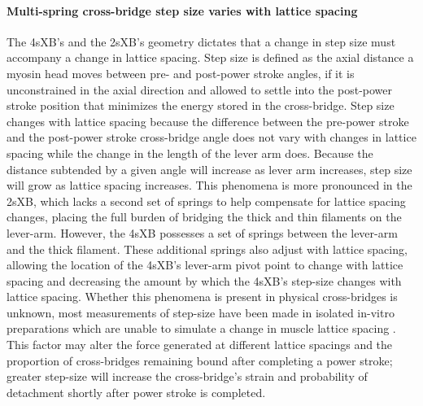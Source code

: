 \documentclass[]{article}
\begin{document}
\paragraph{Multi-spring cross-bridge step size varies with lattice spacing} %
The 4sXB's and the 2sXB's geometry dictates that a change in step size must accompany a change in lattice spacing. 
Step size is defined as the axial distance a myosin head moves between pre- and post-power stroke angles, if it is unconstrained in the axial direction and allowed to settle into the post-power stroke position that minimizes the energy stored in the cross-bridge.
Step size changes with lattice spacing because the difference between the pre-power stroke and the post-power stroke cross-bridge angle does not vary with changes in lattice spacing while the change in the length of the lever arm does. 
Because the distance subtended by a given angle will increase as lever arm increases, step size will grow as lattice spacing increases. 
This phenomena is more pronounced in the 2sXB, which lacks a second set of springs to help compensate for lattice spacing changes, placing the full burden of bridging the thick and thin filaments on the lever-arm. 
However, the 4sXB possesses a set of springs between the lever-arm and the thick filament.
These additional springs also adjust with lattice spacing, allowing the location of the 4sXB's lever-arm pivot point to change with lattice spacing and decreasing the amount by which the 4sXB's step-size changes with lattice spacing.  
Whether this phenomena is present in physical cross-bridges is unknown, most measurements of step-size have been made in isolated in-vitro preparations which are unable to simulate a change in muscle lattice spacing \citep{HowardBook, Peterman2004}.  
This factor may alter the force generated at different lattice spacings and the proportion of cross-bridges remaining bound after completing a power stroke; greater step-size will increase the cross-bridge's strain and probability of detachment shortly after power stroke is completed. 
\end{document}
